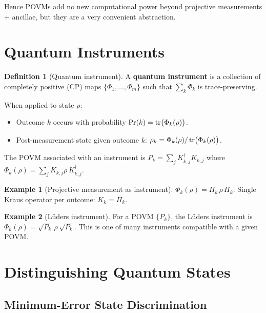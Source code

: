 \documentclass[11pt]{article}
\theoremstyle{definition}
\newtheorem{definition}{Definition}[section]
\newtheorem{example}{Example}[section]
\begin{document}
Hence POVMs add no new computational power beyond projective measurements + ancillae, but they are a very convenient abstraction.

\section{Quantum Instruments}

\begin{definition}[Quantum instrument]
A \textbf{quantum instrument} is a collection of completely positive (CP) maps $\{\Phi_1,\dots,\Phi_m\}$ such that $\sum_k\Phi_k$ is trace-preserving.

When applied to state $\rho$:
\begin{itemize}
    \item Outcome $k$ occurs with probability $\Pr(k)=\tr\bigl(\Phi_k(\rho)\bigr)$.
    \item Post-measurement state given outcome $k$: $\rho_k = \Phi_k(\rho)/\tr\bigl(\Phi_k(\rho)\bigr)$.
\end{itemize}
\end{definition}

The POVM associated with an instrument is $P_k = \sum_j K_{k,j}^\dagger K_{k,j}$ where $\Phi_k(\rho)=\sum_j K_{k,j}\rho\,K_{k,j}^\dagger$.

\begin{example}[Projective measurement as instrument]
$\Phi_k(\rho)=\Pi_k\,\rho\,\Pi_k$.  Single Kraus operator per outcome: $K_k=\Pi_k$.
\end{example}

\begin{example}[L\"uders instrument]
For a POVM $\{P_k\}$, the L\"uders instrument is $\Phi_k(\rho)=\sqrt{P_k}\,\rho\,\sqrt{P_k}$.  This is one of many instruments compatible with a given POVM.
\end{example}

\section{Distinguishing Quantum States}

\subsection{Minimum-Error State Discrimination}
\end{document}
